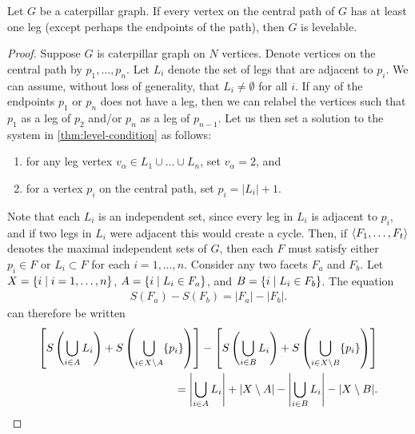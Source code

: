 \begin{theorem} \label{thm:caterpillar}
Let $G$ be a caterpillar graph. If every vertex on the central path of $G$ has at least one leg (except perhaps the endpoints of the path), then $G$ is levelable.
\end{theorem}

\begin{proof}
Suppose $G$ is caterpillar graph on $N$ vertices. Denote vertices on the central path by $p_1, \dots, p_n$. Let $L_i$ denote the set of legs that are adjacent to $p_i$. We can assume, without loss of generality, that $L_i \neq \emptyset$ for all $i$. If any of the endpoints $p_1$ or $p_n$ does not have a leg, then we can relabel the vertices such that $p_1$ as a leg of $p_2$ and/or $p_{n}$ as a leg of $p_{n-1}$. Let us then set a solution to the system in \autoref{thm:level-condition} as follows:
\begin{enumerate}
\item for any leg vertex $v_\alpha \in L_1 \cup \dots \cup L_n$, set $v_\alpha = 2$, and
\item for a vertex $p_i$ on the central path, set $p_i =  |L_i| + 1 $.
\end{enumerate}
Note that each $L_i$ is an independent set, since every leg in $L_i$ is adjacent to $p_i$, and if two legs in $L_i$ were adjacent this would create a cycle. Then, if $\langle F_1, \dots, F_t \rangle$ denotes the maximal independent sets of $G$, then each $F$ must satisfy either $p_i \in F$ or $L_i \subset F$ for each $i = 1, \dots, n$. Consider any two facets $F_a$ and $F_b$. Let $X = \{ i \; | \; i = 1, \dots, n \}$, $A = \{ i \; | \; L_i \in F_a \}$, and $B = \{ i \; | \; L_i \in F_b \}$. The equation
\begin{equation*}
\begin{aligned}
S(F_a) - S(F_b) = |F_a| - |F_b|.
\end{aligned}
\end{equation*}
can therefore be written 
\begin{equation*}
\begin{aligned}
\left[S\left( \bigcup_{i \in A} L_i \right) + 
S\left( \bigcup_{i \in X \setminus A} \{ p_i \} \right) \right] - 
\left[S\left( \bigcup_{i \in B} L_i \right) +
S\left( \bigcup_{i \in X \setminus B} \{ p_i \} \right) \right] \\= \left|\bigcup_{i \in A} L_i \right| + |X \setminus A| - \left|\bigcup_{i \in B} L_i \right| -|X \setminus B|.
\end{aligned}
\end{equation*}

\end{proof}
